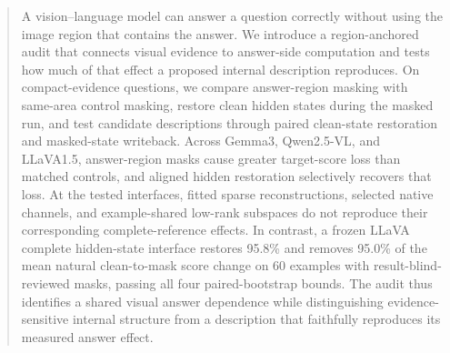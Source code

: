\begin{abstract}
A vision--language model can answer a question correctly without using the image region that contains the answer. We introduce a region-anchored audit that connects visual evidence to answer-side computation and tests how much of that effect a proposed internal description reproduces. On compact-evidence questions, we compare answer-region masking with same-area control masking, restore clean hidden states during the masked run, and test candidate descriptions through paired clean-state restoration and masked-state writeback. Across Gemma3, Qwen2.5-VL, and LLaVA1.5, answer-region masks cause greater target-score loss than matched controls, and aligned hidden restoration selectively recovers that loss. At the tested interfaces, fitted sparse reconstructions, selected native channels, and example-shared low-rank subspaces do not reproduce their corresponding complete-reference effects. In contrast, a frozen LLaVA complete hidden-state interface restores 95.8\% and removes 95.0\% of the mean natural clean-to-mask score change on 60 examples with result-blind-reviewed masks, passing all four paired-bootstrap bounds. The audit thus identifies a shared visual answer dependence while distinguishing evidence-sensitive internal structure from a description that faithfully reproduces its measured answer effect.
\end{abstract}
